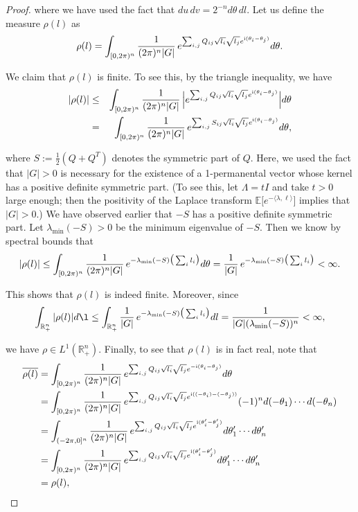 \documentclass[a4paper, 11pt]{article}
\newcommand{\E}{\mathbb{E}}
\newcommand{\compi}{\textnormal{i}}
\begin{document}
\begin{proof}
where we have used the fact that $du\, dv = 2^{-n}d\theta\,dl$. Let us define the measure $\rho(l)$ as
    \[\rho(l)=\int_{[0,2\pi)^n}\frac{1}{(2\pi)^n|G|}\, e^{\sum_{i,j} Q_{ij}\sqrt{l_i}\sqrt{l_j}e^{\compi (\theta_i-\theta_j)}}d\theta.\]

We claim that $\rho(l)$ is finite. To see this, by the triangle inequality, we have
    \begin{eqnarray}
    \label{eq:symmetrize}
|\rho(l)|
    &\leq& \int_{[0,2\pi)^n}\frac{1}{(2\pi)^n|G|}\, \Big|e^{\sum_{i,j} Q_{ij}\sqrt{l_i}\sqrt{l_j}e^{\compi (\theta_i-\theta_j)}}\Big| d\theta \nonumber\\
    &=& \int_{[0,2\pi)^n}\frac{1}{(2\pi)^n|G|}\, e^{\sum_{i,j} S_{ij}\sqrt{l_i}\sqrt{l_j}e^{\compi (\theta_i-\theta_j)}} d\theta,
    \end{eqnarray}

where $S:=\frac{1}{2}(Q+Q^T)$ denotes the symmetric part of $Q$.
Here, we used the fact that $|G|>0$ is necessary for the existence of a 1-permanental vector whose kernel has a positive definite symmetric part. (To see this, let $\Lambda=t I$ and take $t>0$ large enough; then the positivity of the Laplace transform $\E\big[e^{-\langle\lambda,\ell\rangle}\big]$ implies that $|G|>0$.) We have observed earlier that $-S$ has a positive definite symmetric part.
Let $\lambda_{\min}(-S)>0$ be the minimum eigenvalue of $-S$. Then we know by spectral bounds that
    \[|\rho(l)|
    \leq \int_{[0,2\pi)^n}\frac{1}{(2\pi)^n|G|}\, e^{-\lambda_{\min}(-S)\big(\sum_i l_i\big)} d\theta\\
= \frac{1}{|G|}\, e^{-\lambda_{\min}(-S)\big(\sum_i l_i\big)}<\infty.\]

This shows that $\rho(l)$ is indeed finite. Moreover, since
    \[\int_{\mathbb{R}_+^n}|\rho(l)|d\l\leq \int_{\mathbb{R}_+^n}\frac{1}{|G|}\, e^{-\lambda_{\min}(-S)\big(\sum_i l_i\big)}dl = \frac{1}{|G|(\lambda_{\min}(-S))^n}<\infty,\]

we have $\rho\in L^1(\mathbb{R}_+^n)$. Finally, to see that $\rho(l)$ is in fact real, note that
    \begin{equation*}
    \begin{aligned}
    \overline{\rho(l)}
    &=\int_{[0,2\pi)^n}\frac{1}{(2\pi)^n|G|}\, e^{\sum_{i,j} Q_{ij}\sqrt{l_i}\sqrt{l_j}e^{-\compi (\theta_i-\theta_j)}}d\theta\\
    &=\int_{[0,2\pi)^n}\frac{1}{(2\pi)^n|G|}\, e^{\sum_{i,j} Q_{ij}\sqrt{l_i}\sqrt{l_j}e^{\compi ((-\theta_i)-(-\theta_j))}}(-1)^n d(-\theta_1)\cdots d(-\theta_n)\\
    &=\int_{(-2\pi,0]^n}\frac{1}{(2\pi)^n|G|}\, e^{\sum_{i,j} Q_{ij}\sqrt{l_i}\sqrt{l_j}e^{\compi (\theta_i'-\theta_j')}} d\theta_1'\cdots d\theta_n'\\
    &=\int_{[0,2\pi)^n}\frac{1}{(2\pi)^n|G|}\, e^{\sum_{i,j} Q_{ij}\sqrt{l_i}\sqrt{l_j}e^{\compi (\theta_i'-\theta_j')}} d\theta_1'\cdots d\theta_n'\\
    &=\rho(l),
    \end{aligned}
    \end{equation*}


\end{proof}
\end{document}

